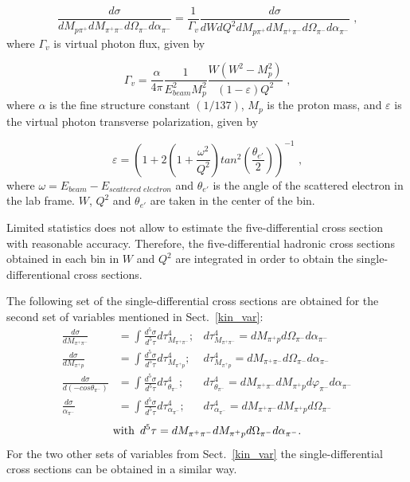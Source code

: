 \begin{equation}
\frac{d\sigma}{dM_{p\pi^{+}}dM_{\pi^{+}\pi^{-}}d\Omega_{\pi^{-}}
d\alpha_{\pi^{-}}} = \frac{1}{\Gamma_{v}}
\frac{d\sigma}{dWdQ^{2}dM_{p\pi^{+}}dM_{\pi^{+}\pi^{-}}d\Omega_{\pi^{-}}
d\alpha_{\pi^{-}}}  \textrm{ ,}
\label{fulldiff}
\end{equation}
where $\Gamma_{v}$ is 
virtual photon flux, given by

\begin{equation}
\Gamma_{v} =
\frac{\alpha}{4\pi}\frac{1}{E_{beam}^{2}M_{p}^{2}}\frac{W(W^{2}-M_{p}^{2})}
{(1-\varepsilon)Q^{2}} \textrm{ ,}
\label{flux}
\end{equation}
where $\alpha$ is the fine structure constant $\left(1/137\right)$, $M_{p}$ is the proton
mass, and $\varepsilon$ is the virtual photon transverse polarization, given by

\begin{equation}
\varepsilon = \left( 1 + 2\left( 1 +
\frac{\omega^{2}}{Q^{2}} \right)
tan^{2}\left(\frac{\theta_{e'}}{2}\right) \right)^{-1} \textrm{ ,}
\label{polarization}
\end{equation}
where $\omega = E_{beam} - E_{scattered \,\, electron}$ and
$\theta_{e'}$ is the angle of the scattered electron in the
lab frame. $W$, $Q^{2}$ and $\theta_{e'}$ are
taken in the center of the bin.

Limited
statistics does not allow to estimate
the five-differential cross section with reasonable
accuracy. Therefore, the five-differential hadronic cross sections obtained in each bin in $W$ and $Q^2$ are integrated in order to obtain the single-differentional cross sections.


The following set of the single-differential cross sections are obtained for the second set of variables mentioned in Sect.~\ref{kin_var}:
\begin{equation}
\begin{aligned}
\frac{d\sigma}{dM_{\pi^{+}\pi^{-}}} & =
\int\frac{d^{5}\sigma}{d^{5}\tau}d\tau_{M_{\pi^{+}\pi^{-}}}^{4}; & 
 d\tau_{M_{\pi^{+}\pi^{-}}}^{4} =
dM_{\pi^{+}p}d\Omega_{\pi^{-}}d\alpha_{\pi^{-}} \\
\frac{d\sigma}{dM_{\pi^{+}p}} & =
\int\frac{d^{5}\sigma}{d^{5}\tau}d\tau_{M_{\pi^{+}p}}^{4}; & 
d\tau_{M_{\pi^{+}p}}^{4} =
dM_{\pi^{+}\pi^{-}}d\Omega_{\pi^{-}}d\alpha_{\pi^{-}} \\
\frac{d\sigma}{d(-cos\theta_{\pi^{-}})} & =
\int\frac{d^{5}\sigma}{d^{5}\tau}d\tau_{\theta_{\pi^{-}}}^{4}; & 
d\tau_{\theta_{\pi^{-}}}^{4} =
dM_{\pi^{+}\pi^{-}}dM_{\pi^{+}p}d\varphi_{\pi^{-}}d\alpha_{\pi^{-}} \\
\frac{d\sigma}{\alpha_{\pi^{-}}} & =
\int\frac{d^{5}\sigma}{d^{5}\tau}d\tau_{\alpha_{\pi^{-}}}^{4}; & 
d\tau_{\alpha_{\pi^{-}}}^{4} =
dM_{\pi^{+}\pi^{-}}dM_{\pi^{+}p}d\Omega_{\pi^{-}}
\end{aligned}
\label{inegr5diff}
\end{equation}
$$
\text{with\,\,\,} d^{5}\tau = dM_{\pi^{+}\pi^{-}}dM_{\pi^{+}p}d\Omega_{\pi^{-}}d\alpha_{\pi^{-}}. 
$$
For the two other sets of variables from Sect.~\ref{kin_var} the single-differential cross sections can be obtained in a similar way.


